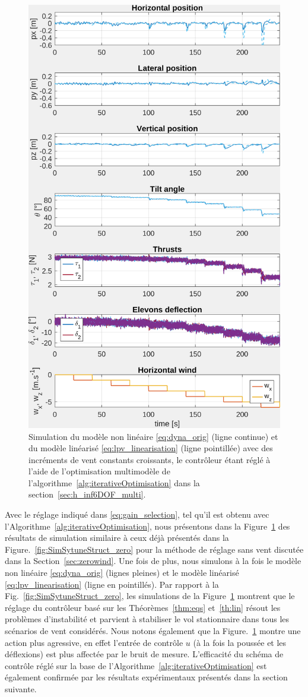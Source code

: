 \begin{figure}[ht!]
    \centering
    \includegraphics[trim=0cm 0cm 0cm 0cm,clip,width=0.6\columnwidth]{figures/sim_systune_lpv_noise.png}
    \caption{Simulation du modèle non linéaire \eqref{eq:dyna_orig} (ligne continue) et du modèle linéarisé \eqref{eq:lpv_linearisation} (ligne pointillée) avec des incréments de vent constants croissants, le contrôleur étant réglé à l'aide de l'optimisation multimodèle de l'algorithme~\ref{alg:iterativeOptimisation} dans la section~\ref{sec:h_inf6DOF_multi}.}
    \label{fig:SimSytuneStruct_lpv}
\end{figure}

Avec le réglage indiqué dans \eqref{eq:gain_selection}, tel qu'il est obtenu avec l'Algorithme~\ref{alg:iterativeOptimisation}, nous présentons dans la Figure~\ref{fig:SimSytuneStruct_lpv} des résultats de simulation similaire à ceux déjà présentés dans la Figure.~\ref{fig:SimSytuneStruct_zero} pour la méthode de réglage sans vent discutée dans la Section~\ref{sec:zerowind}. Une fois de plus, nous simulons à la fois le modèle non linéaire \eqref{eq:dyna_orig} (lignes pleines) et le modèle linéarisé \eqref{eq:lpv_linearisation} (ligne en pointillés). 
Par rapport à la Fig.~\ref{fig:SimSytuneStruct_zero}, les simulations de la Figure~\ref{fig:SimSytuneStruct_lpv} montrent que le réglage du contrôleur basé sur les Théorèmes~\ref{thm:eqs} et~\ref{th:lin} résout les problèmes d'instabilité et parvient à stabiliser le vol stationnaire dans tous les scénarios de vent considérés. Nous notons également que la Figure.~\ref{fig:SimSytuneStruct_lpv} montre une action plus agressive, en effet l'entrée de contrôle $u$ (à la fois la poussée et les déflexions) est plus affectée par le bruit de mesure.
L'efficacité du schéma de contrôle réglé sur la base de l'Algorithme~\ref{alg:iterativeOptimisation} est également confirmée par les résultats expérimentaux présentés dans la section suivante.



